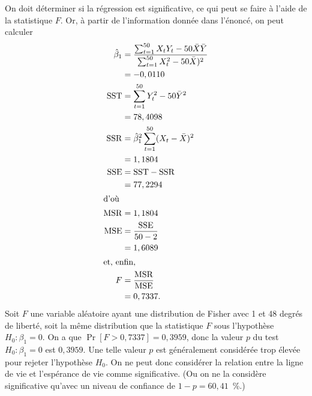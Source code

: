 \begin{solution}{2.14}
    On doit déterminer si la régression est significative, ce qui peut
    se faire à l'aide de la statistique $F$. Or, à partir de
    l'information donnée dans l'énoncé, on peut calculer
    \begin{align*}
      \hat{\beta}_1
      &= \frac{\sum_{t=1}^{50} X_t Y_t - 50 \bar{X} \bar{Y}}{%
        \sum_{t=1}^{50} X_t^2 - 50 \bar{X})^2} \\
      &= -0,0110 \\
      \SST
      &= \sum_{t=1}^{50} Y_t^2 - 50 \bar{Y}^2 \\
      &= 78,4098 \\
      \SSR
      &= \hat{\beta}_1^2 \sum_{t=1}^{50} (X_t - \bar{X})^2 \\
      &= 1,1804 \\
      \SSE
      &= \SST - \SSR \\
      &= 77,2294 \\
      \intertext{d'où}
      \MSR
      &= 1,1804 \\
      \MSE
      &= \frac{\SSE}{50 - 2} \\
      &= 1,6089 \\
      \intertext{et, enfin,}
      F
      &= \frac{\MSR}{\MSE} \\
      &= 0,7337.
    \end{align*}
    Soit $F$ une variable aléatoire ayant une distribution de Fisher
    avec 1 et 48 degrés de liberté, soit la même distribution que la
    statistique $F$ sous l'hypothèse $H_0: \beta_1 = 0$. On a que
    $\Pr[F > 0,7337] = 0,3959$, donc la valeur $p$ du test $H_0:
    \beta_1 = 0$ est $0,3959$. Une telle valeur $p$ est généralement
    considérée trop élevée pour rejeter l'hypothèse $H_0$. On ne peut
    donc considérer la relation entre la ligne de vie et l'espérance
    de vie comme significative. (Ou on ne la considère significative
    qu'avec un niveau de confiance de $1 - p = 60,41$~\%.)
  
\end{solution}
